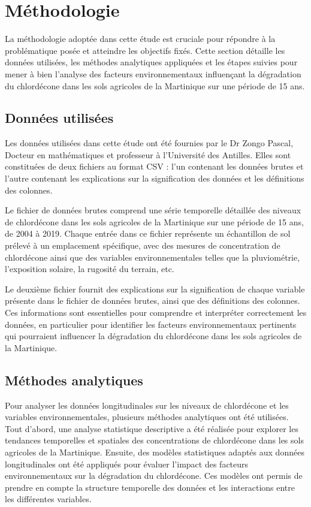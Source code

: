 \documentclass{report}
\begin{document}
\chapter*{Méthodologie}


La méthodologie adoptée dans cette étude est cruciale pour répondre à la problématique posée et atteindre les objectifs fixés. Cette section détaille les données utilisées, les méthodes analytiques appliquées et les étapes suivies pour mener à bien l'analyse des facteurs environnementaux influençant la dégradation du chlordécone dans les sols agricoles de la Martinique sur une période de 15 ans.

\section{Données utilisées}

Les données utilisées dans cette étude ont été fournies par le Dr Zongo Pascal, Docteur en mathématiques et professeur à l'Université des Antilles. Elles sont constituées de deux fichiers au format CSV : l'un contenant les données brutes et l'autre contenant les explications sur la signification des données et les définitions des colonnes.

Le fichier de données brutes comprend une série temporelle détaillée des niveaux de chlordécone dans les sols agricoles de la Martinique sur une période de 15 ans, de 2004 à 2019. Chaque entrée dans ce fichier représente un échantillon de sol prélevé à un emplacement spécifique, avec des mesures de concentration de chlordécone ainsi que des variables environnementales telles que la pluviométrie, l'exposition solaire, la rugosité du terrain, etc.

Le deuxième fichier fournit des explications sur la signification de chaque variable présente dans le fichier de données brutes, ainsi que des définitions des colonnes. Ces informations sont essentielles pour comprendre et interpréter correctement les données, en particulier pour identifier les facteurs environnementaux pertinents qui pourraient influencer la dégradation du chlordécone dans les sols agricoles de la Martinique.
 
\section{Méthodes analytiques}

Pour analyser les données longitudinales sur les niveaux de chlordécone et les variables environnementales, plusieurs méthodes analytiques ont été utilisées. Tout d'abord, une analyse statistique descriptive a été réalisée pour explorer les tendances temporelles et spatiales des concentrations de chlordécone dans les sols agricoles de la Martinique. Ensuite, des modèles statistiques adaptés aux données longitudinales ont été appliqués pour évaluer l'impact des facteurs environnementaux sur la dégradation du chlordécone. Ces modèles ont permis de prendre en compte la structure temporelle des données et les interactions entre les différentes variables.
\end{document}
